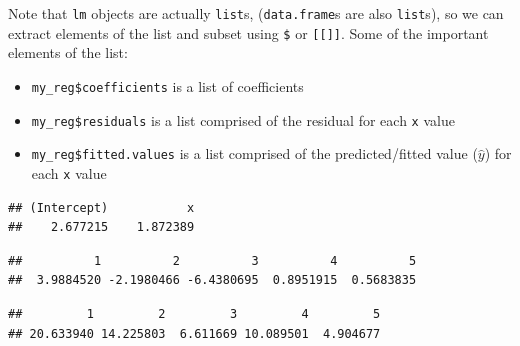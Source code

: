 \documentclass[]{book}
\newenvironment{Shaded}{\begin{snugshade}}{\end{snugshade}}
\newcommand{\DecValTok}[1]{\textcolor[rgb]{0.00,0.00,0.81}{#1}}
\newcommand{\CommentTok}[1]{\textcolor[rgb]{0.56,0.35,0.01}{\textit{#1}}}
\newcommand{\OperatorTok}[1]{\textcolor[rgb]{0.81,0.36,0.00}{\textbf{#1}}}
\newcommand{\NormalTok}[1]{#1}
\providecommand{\tightlist}{%
  \setlength{\itemsep}{0pt}\setlength{\parskip}{0pt}}
\theoremstyle{definition}
\theoremstyle{definition}
\theoremstyle{definition}
\theoremstyle{remark}
\begin{document}
Note that \texttt{lm} objects are actually \texttt{list}s,
(\texttt{data.frame}s are also \texttt{list}s), so we can extract
elements of the list and subset using \texttt{\$} or
\texttt{{[}{[}{]}{]}}. Some of the important elements of the list:

\begin{itemize}
\tightlist
\item
  \texttt{my\_reg\$coefficients} is a list of coefficients
\item
  \texttt{my\_reg\$residuals} is a list comprised of the residual for
  each \texttt{x} value
\item
  \texttt{my\_reg\$fitted.values} is a list comprised of the
  predicted/fitted value (\(\hat{y}\)) for each \texttt{x} value
\end{itemize}

\begin{Shaded}
\end{Shaded}

\begin{verbatim}
## (Intercept)           x 
##    2.677215    1.872389
\end{verbatim}

\begin{Shaded}
\end{Shaded}

\begin{verbatim}
##          1          2          3          4          5 
##  3.9884520 -2.1980466 -6.4380695  0.8951915  0.5683835
\end{verbatim}

\begin{Shaded}
\end{Shaded}

\begin{verbatim}
##         1         2         3         4         5 
## 20.633940 14.225803  6.611669 10.089501  4.904677
\end{verbatim}
\end{document}
